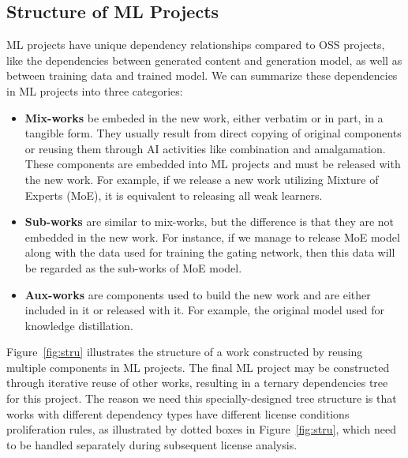 \subsection{Structure of ML Projects}
ML projects have unique dependency relationships compared to OSS projects, like the dependencies between generated content and generation model, as well as between training data and trained model.
We can summarize these dependencies in ML projects into three categories:
\begin{itemize}%
    \item \textbf{Mix-works} be embeded in the new work, either verbatim or in part, in a tangible form.
    They usually result from direct copying of original components or reusing them through AI activities like combination and amalgamation. These components are embedded into ML projects and must be released with the new work. 
    For example, if we release a new work utilizing Mixture of Experts (MoE), it is equivalent to releasing all weak learners.

    \item \textbf{Sub-works} are similar to mix-works, but the difference is that they are not embedded in the new work. For instance, if we manage to release MoE model along with the data used for training the gating network, then this data will be regarded as the sub-works of MoE model.
    
    \item \textbf{Aux-works} are components used to build the new work and are either included in it or released with it. For example, the original model used for knowledge distillation.
\end{itemize}

Figure~\ref{fig:stru} illustrates the structure of a work constructed by reusing multiple components in ML projects.
The final ML project may be constructed through iterative reuse of other works, resulting in a ternary dependencies tree for this project.
The reason we need this specially-designed tree structure is that works with different dependency types have different license conditions proliferation rules, as illustrated by dotted boxes in Figure~\ref{fig:stru}, which need to be handled separately during subsequent license analysis. 


